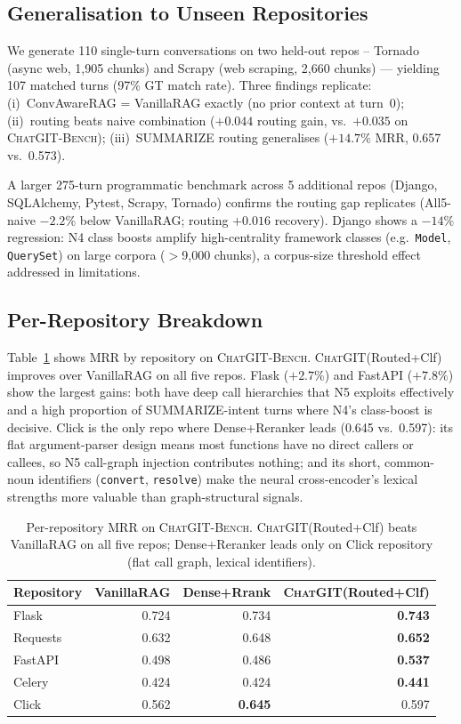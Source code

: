 \documentclass[conference]{IEEEtran}
\newcommand{\chatgit}{\textsc{ChatGIT}\xspace}
\newcommand{\conv}{\textsc{ChatGIT-Bench}\xspace}
\begin{document}
\subsection{Generalisation to Unseen Repositories}

We generate 110 single-turn conversations on two held-out repos --
Tornado (async web, 1,905 chunks) and Scrapy (web scraping, 2,660 chunks)
--- yielding 107 matched turns (97\% GT match rate).
Three findings replicate: (i)~ConvAwareRAG = VanillaRAG exactly (no prior
context at turn~0); (ii)~routing beats naive combination ($+0.044$ routing
gain, vs.\ $+0.035$ on \conv); (iii)~SUMMARIZE routing generalises
($+14.7\%$ MRR, 0.657 vs.\ 0.573).

A larger 275-turn programmatic benchmark across 5 additional repos
(Django, SQLAlchemy, Pytest, Scrapy, Tornado) confirms the routing gap
replicates (All5-naive $-2.2\%$ below VanillaRAG; routing $+0.016$
recovery). Django shows a $-14\%$ regression: N4 class boosts amplify
high-centrality framework classes (e.g.\ \texttt{Model}, \texttt{QuerySet})
on large corpora ($>$9,000 chunks), a corpus-size threshold effect
addressed in limitations.

\subsection{Per-Repository Breakdown}

Table~\ref{tab:per_repo} shows MRR by repository on \conv.
\chatgit (Routed+Clf) improves over VanillaRAG on all five repos.
Flask ($+2.7\%$) and FastAPI ($+7.8\%$) show the largest gains: both
have deep call hierarchies that N5 exploits effectively and a high
proportion of SUMMARIZE-intent turns where N4's class-boost is decisive.
Click is the only repo where Dense+Reranker leads (0.645 vs.\ 0.597):
its flat argument-parser design means most functions have no direct
callers or callees, so N5 call-graph injection contributes nothing;
and its short, common-noun identifiers (\texttt{convert}, \texttt{resolve})
make the neural cross-encoder's lexical strengths more valuable than
graph-structural signals.

\begin{table}[ht]
\centering
\caption{Per-repository MRR on \conv. \chatgit (Routed+Clf) beats
VanillaRAG on all five repos; Dense+Reranker leads only on Click repository
(flat call graph, lexical identifiers).}
\label{tab:per_repo}
\footnotesize
\begin{tabular}{lrrr}
\toprule
Repository & VanillaRAG & Dense+Rrank & \chatgit (Routed+Clf) \\
\midrule
Flask      & 0.724 & 0.734 & \textbf{0.743} \\
Requests   & 0.632 & 0.648 & \textbf{0.652} \\
FastAPI    & 0.498 & 0.486 & \textbf{0.537} \\
Celery     & 0.424 & 0.424 & \textbf{0.441} \\
Click      & 0.562 & \textbf{0.645} & 0.597 \\
\bottomrule
\end{tabular}
\end{table}
\end{document}

